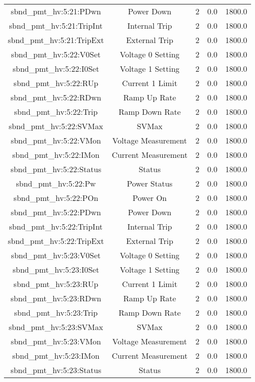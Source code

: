 \begin{table}[ptb]
\begin{tabular}{c | c c c c}
sbnd_pmt_hv:5:21:PDwn & Power Down & 2 & 0.0 & 1800.0\\ 
sbnd_pmt_hv:5:21:TripInt & Internal Trip & 2 & 0.0 & 1800.0\\ 
sbnd_pmt_hv:5:21:TripExt & External Trip & 2 & 0.0 & 1800.0\\ 
sbnd_pmt_hv:5:22:V0Set & Voltage 0 Setting & 2 & 0.0 & 1800.0\\ 
sbnd_pmt_hv:5:22:I0Set & Voltage 1 Setting & 2 & 0.0 & 1800.0\\ 
sbnd_pmt_hv:5:22:RUp & Current 1 Limit & 2 & 0.0 & 1800.0\\ 
sbnd_pmt_hv:5:22:RDwn & Ramp Up Rate & 2 & 0.0 & 1800.0\\ 
sbnd_pmt_hv:5:22:Trip & Ramp Down Rate & 2 & 0.0 & 1800.0\\ 
sbnd_pmt_hv:5:22:SVMax & SVMax & 2 & 0.0 & 1800.0\\ 
sbnd_pmt_hv:5:22:VMon & Voltage Measurement & 2 & 0.0 & 1800.0\\ 
sbnd_pmt_hv:5:22:IMon & Current Measurement & 2 & 0.0 & 1800.0\\ 
sbnd_pmt_hv:5:22:Status & Status & 2 & 0.0 & 1800.0\\ 
sbnd_pmt_hv:5:22:Pw & Power Status & 2 & 0.0 & 1800.0\\ 
sbnd_pmt_hv:5:22:POn & Power On & 2 & 0.0 & 1800.0\\ 
sbnd_pmt_hv:5:22:PDwn & Power Down & 2 & 0.0 & 1800.0\\ 
sbnd_pmt_hv:5:22:TripInt & Internal Trip & 2 & 0.0 & 1800.0\\ 
sbnd_pmt_hv:5:22:TripExt & External Trip & 2 & 0.0 & 1800.0\\ 
sbnd_pmt_hv:5:23:V0Set & Voltage 0 Setting & 2 & 0.0 & 1800.0\\ 
sbnd_pmt_hv:5:23:I0Set & Voltage 1 Setting & 2 & 0.0 & 1800.0\\ 
sbnd_pmt_hv:5:23:RUp & Current 1 Limit & 2 & 0.0 & 1800.0\\ 
sbnd_pmt_hv:5:23:RDwn & Ramp Up Rate & 2 & 0.0 & 1800.0\\ 
sbnd_pmt_hv:5:23:Trip & Ramp Down Rate & 2 & 0.0 & 1800.0\\ 
sbnd_pmt_hv:5:23:SVMax & SVMax & 2 & 0.0 & 1800.0\\ 
sbnd_pmt_hv:5:23:VMon & Voltage Measurement & 2 & 0.0 & 1800.0\\ 
sbnd_pmt_hv:5:23:IMon & Current Measurement & 2 & 0.0 & 1800.0\\ 
sbnd_pmt_hv:5:23:Status & Status & 2 & 0.0 & 1800.0\\ 

\end{tabular}
\end{table}
